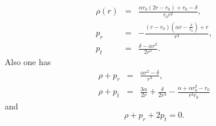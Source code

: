 \documentclass[10pt]{revtex4}
\begin{document}
\begin{eqnarray}
\rho(r)&=&\frac{\alpha r_0(2r-r_0)+r_0-\delta}{r_0r^2},\label{eq15}\\
p_r&=&-\frac{(r-r_0)(\alpha r-\frac{\delta}{r_0})+r}{r^3},\label{eq16}\\
p_t&=&\frac{\delta -\alpha r^2}{2r^3} .\label{eq17}
\end{eqnarray}
Also one has
\begin{eqnarray}
\rho+p_r&=&\frac{\alpha r^2-\delta}{r^3},\label{eq18}\\
\rho+p_t&=&\frac{3\alpha}{2r}+\frac{\delta}{2r^3}-\frac{\alpha+\alpha r_0^2-r_0}{r^2r_0} \label{eq19}
\end{eqnarray}
and
\begin{equation}
\rho+p_r+2p_t=0.\label{eq20}
\end{equation}\par
\end{document}
